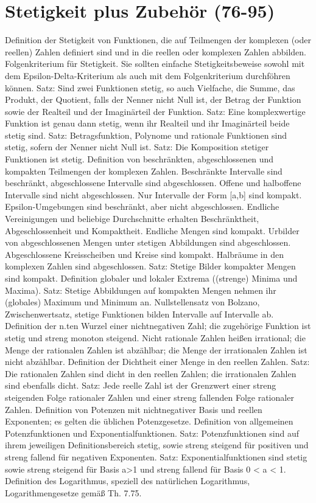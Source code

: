 \section{Stetigkeit plus Zubehör (76-95)}
 
Definition der Stetigkeit von Funktionen, die auf Teilmengen der komplexen (oder reellen) Zahlen definiert sind und in die reellen oder komplexen Zahlen abbilden. Folgenkriterium für Stetigkeit. Sie sollten einfache Stetigkeitsbeweise sowohl mit dem Epsilon-Delta-Kriterium als auch mit dem Folgenkriterium durchföhren können. Satz: Sind zwei Funktionen stetig, so auch Vielfache, die Summe, das Produkt, der Quotient, falls der Nenner nicht Null ist, der Betrag der Funktion sowie der Realteil und der Imaginärteil der Funktion. Satz: Eine komplexwertige Funktion ist genau dann stetig, wenn ihr Realteil und ihr Imaginärteil beide stetig sind. Satz: Betragsfunktion, Polynome und rationale Funktionen sind stetig, sofern der Nenner nicht Null ist. Satz: Die Komposition stetiger Funktionen ist stetig. Definition von beschränkten, abgeschlossenen und kompakten Teilmengen der komplexen Zahlen. Beschränkte Intervalle sind beschränkt, abgeschlossene Intervalle sind abgeschlossen. Offene und halboffene Intervalle sind nicht abgeschlossen. Nur Intervalle der Form [a,b] sind kompakt. Epsilon-Umgebungen sind beschränkt, aber nicht abgeschlossen. Endliche Vereinigungen und beliebige Durchschnitte erhalten Beschränktheit, Abgeschlossenheit und Kompaktheit. Endliche Mengen sind kompakt. Urbilder von abgeschlossenen Mengen unter stetigen Abbildungen sind abgeschlossen. Abgeschlossene Kreisscheiben und Kreise sind kompakt. Halbräume in den komplexen Zahlen sind abgeschlossen. Satz: Stetige Bilder kompakter Mengen sind kompakt. Definition globaler und lokaler Extrema ((strenge) Minima und Maxima). Satz: Stetige Abbildungen auf kompakten Mengen nehmen ihr (globales) Maximum und Minimum an. Nullstellensatz von Bolzano, Zwischenwertsatz, stetige Funktionen bilden Intervalle auf Intervalle ab. Definition der n.ten Wurzel einer nichtnegativen Zahl; die zugehörige Funktion ist stetig und streng monoton steigend. Nicht rationale Zahlen heißen irrational; die Menge der rationalen Zahlen ist abzählbar; die Menge der irrationalen Zahlen ist nicht abzählbar. Definition der Dichtheit einer Menge in den reellen Zahlen. Satz: Die rationalen Zahlen sind dicht in den reellen Zahlen; die irrationalen Zahlen sind ebenfalls dicht. Satz: Jede reelle Zahl ist der Grenzwert einer streng steigenden Folge rationaler Zahlen und einer streng fallenden Folge rationaler Zahlen. Definition von Potenzen mit nichtnegativer Basis und reellen Exponenten; es gelten die üblichen Potenzgesetze. Definition von allgemeinen Potenzfunktionen und Exponentialfunktionen. Satz: Potenzfunktionen sind auf ihrem jeweiligen Definitionsbereich stetig, sowie streng steigend für positiven und streng fallend für negativen Exponenten. Satz: Exponentialfunktionen sind stetig sowie streng steigend für Basis a>1 und streng fallend für Basis 0 < a < 1. Definition des Logarithmus, speziell des natürlichen Logarithmus, Logarithmengesetze gemäß Th. 7.75. 


